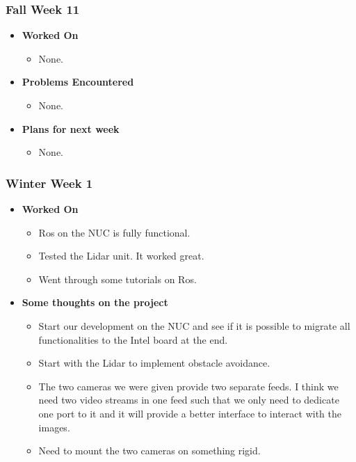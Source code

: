 \documentclass{article}
\begin{document}
\subsubsection{Fall Week 11}
\begin{itemize}
    \item {\textbf{Worked On}}
    \begin{itemize}
      \item None.
    \end{itemize}

    \item {\textbf{Problems Encountered}}
    \begin{itemize}
      \item None.
    \end{itemize}

    \item{\textbf{Plans for next week}}
    \begin{itemize}
      \item None.
    \end{itemize}

\end{itemize}

\subsubsection{Winter Week 1}
\begin{itemize}
    \item {\textbf{Worked On}}
    \begin{itemize}
      \item Ros on the NUC is fully functional.
      \item Tested the Lidar unit. It worked great.
      \item Went through some tutorials on Ros.
    \end{itemize}

    \item {\textbf{Some thoughts on the project}}
    \begin{itemize}
      \item Start our development on the NUC and see if it is possible to
      migrate all functionalities to the Intel board at the end.
      \item Start with the Lidar to implement obstacle avoidance.
      \item The two cameras we were given provide two separate feeds. I
      think we need two video streams in one feed such that we only need to
      dedicate one port to it and it will provide a better interface to
      interact with the images.
      \item Need to mount the two cameras on something rigid.
    \end{itemize}

\end{itemize}
\end{document}
